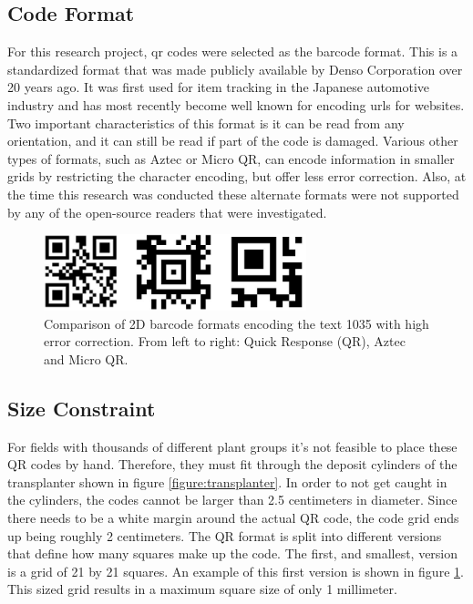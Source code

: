 \subsection{Code Format}
\label{section:code_format}

For this research project, \acf{qr} codes were selected as the barcode format. This is a standardized format that was made publicly available by Denso Corporation over 20 years ago.  It was first used for item tracking in the Japanese automotive industry and has most recently become well known for encoding \acp{url} for websites.  Two important characteristics of this format is it can be read from any orientation, and it can still be read if part of the code is damaged.  Various other types of formats, such as Aztec or Micro QR, can encode information in smaller grids by restricting the character encoding, but offer less error correction.  Also, at the time this research was conducted these alternate formats were not supported by any of the open-source readers that were investigated. 

\begin{figure}
	\centering
    \includegraphics[width=3in]{figures/generated_codes_1035.jpg}
    \caption[2D barcode formats]{Comparison of 2D barcode formats encoding the text 1035 with high error correction.  From left to right: Quick Response (QR), Aztec and Micro QR.}
    \label{barcode_formats}
\end{figure} 

\subsection{Size Constraint}

For fields with thousands of different plant groups it's not feasible to place these QR codes by hand.  Therefore, they must fit through the deposit cylinders of the transplanter shown in figure \ref{figure:transplanter}.  In order to not get caught in the cylinders, the codes cannot be larger than 2.5 centimeters in diameter. Since there needs to be a white margin around the actual QR code, the code grid ends up being roughly 2 centimeters.  The QR format is split into different versions that define how many squares make up the code.  The first, and smallest, version is a grid of 21 by 21 squares.  An example of this first version is shown in figure \ref{barcode_formats}.  This sized grid results in a maximum square size of only 1 millimeter.  

